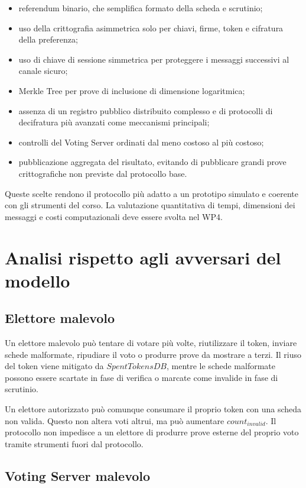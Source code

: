 \documentclass[a4paper,12pt]{article}
\begin{document}
\begin{itemize}
    \item referendum binario, che semplifica formato della scheda e scrutinio;
    \item uso della crittografia asimmetrica solo per chiavi, firme, token e cifratura della preferenza;
    \item uso di chiave di sessione simmetrica per proteggere i messaggi successivi al canale sicuro;
    \item Merkle Tree per prove di inclusione di dimensione logaritmica;
    \item assenza di un registro pubblico distribuito complesso e di protocolli di decifratura più avanzati come meccanismi principali;
    \item controlli del Voting Server ordinati dal meno costoso al più costoso;
    \item pubblicazione aggregata del risultato, evitando di pubblicare grandi prove crittografiche non previste dal protocollo base.
\end{itemize}

Queste scelte rendono il protocollo più adatto a un prototipo simulato e coerente con gli strumenti del corso.
La valutazione quantitativa di tempi, dimensioni dei messaggi e costi computazionali deve essere svolta nel WP4.

\section{Analisi rispetto agli avversari del modello}

\subsection{Elettore malevolo}

Un elettore malevolo può tentare di votare più volte, riutilizzare il token, inviare schede malformate, ripudiare il voto o produrre prove da mostrare a terzi.
Il riuso del token viene mitigato da \(SpentTokensDB\), mentre le schede malformate possono essere scartate in fase di verifica o marcate come invalide in fase di scrutinio.

Un elettore autorizzato può comunque consumare il proprio token con una scheda non valida.
Questo non altera voti altrui, ma può aumentare \(count_{invalid}\).
Il protocollo non impedisce a un elettore di produrre prove esterne del proprio voto tramite strumenti fuori dal protocollo.

\subsection{Voting Server malevolo}
\end{document}
